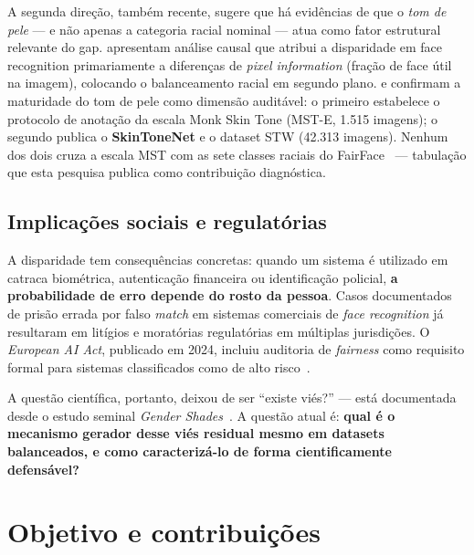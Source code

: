 A segunda direção, também recente, sugere que há evidências de que o \emph{tom de pele} --- e não apenas a categoria racial nominal --- atua como fator estrutural relevante do gap.  apresentam análise causal que atribui a disparidade em face recognition primariamente a diferenças de \emph{pixel information} (fração de face útil na imagem), colocando o balanceamento racial em segundo plano.  e  confirmam a maturidade do tom de pele como dimensão auditável: o primeiro estabelece o protocolo de anotação da escala Monk Skin Tone (MST-E, 1.515 imagens); o segundo publica o \textbf{SkinToneNet} e o dataset STW (42.313 imagens). Nenhum dos dois cruza a escala MST com as sete classes raciais do FairFace~\cite{karkkainen2021fairface} --- tabulação que esta pesquisa publica como contribuição diagnóstica.

\subsection{Implicações sociais e regulatórias}
\label{sec:problema_sociais}

A disparidade tem consequências concretas: quando um sistema é utilizado em catraca biométrica, autenticação financeira ou identificação policial, \textbf{a probabilidade de erro depende do rosto da pessoa}. Casos documentados de prisão errada por falso \emph{match} em sistemas comerciais de \emph{face recognition} já resultaram em litígios e moratórias regulatórias em múltiplas jurisdições. O \emph{European AI Act}, publicado em 2024, incluiu auditoria de \emph{fairness} como requisito formal para sistemas classificados como de alto risco~\cite{lafargue2025fairness}.

A questão científica, portanto, deixou de ser ``existe viés?'' --- está documentada desde o estudo seminal \emph{Gender Shades}~\cite{buolamwini2018gender}. A questão atual é: \textbf{qual é o mecanismo gerador desse viés residual mesmo em datasets balanceados, e como caracterizá-lo de forma cientificamente defensável?}

\section{Objetivo e contribuições}
\label{sec:intro_objetivo}


